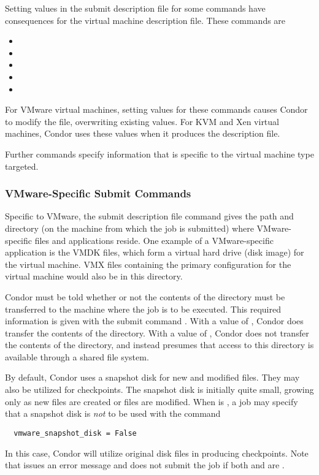 Setting values in the submit description file for some commands
have consequences for the virtual machine description file.
These commands are
\begin{itemize}
  \item {}
  \item {}
  \item {}
  \item {}
  \item {}
\end{itemize}
For VMware virtual machines,
setting values for these commands causes Condor to modify the
 file, overwriting existing values.
For KVM and Xen virtual machines,
Condor uses these values when it produces the description file.

Further commands specify information that is specific to the
virtual machine type targeted.

\subsubsection{\label{sec:vm-VMwaresubmitfile}VMware-Specific Submit Commands}

Specific to VMware, the submit description file command
 gives the path and directory
(on the machine from which the job is submitted)
where VMware-specific files and applications reside.
One example of a VMware-specific application is the VMDK files,
which form a virtual hard drive (disk image) for the virtual machine.
VMX files containing the primary configuration for the virtual
machine would also be in this directory.

Condor must be told whether or not the contents of the 
directory must be transferred to the machine where the job is
to be executed.
This required information is given with the submit command
.
With a value of ,
Condor does transfer the contents of the directory.
With a value of ,
Condor does not transfer the contents of the directory,
and instead presumes that access to this directory is
available through a shared file system.

By default, Condor uses a snapshot disk for new and modified files.
They may also be utilized for checkpoints.
The snapshot disk is initially quite small,
growing only as new files are created or files are modified.
When  is ,
a job may specify that a snapshot disk is \emph{not} to be
used with the command
\begin{verbatim}
  vmware_snapshot_disk = False
\end{verbatim}
In this case, Condor will utilize original disk files in producing
checkpoints. 
Note that  issues an error message and does not
submit the job if both 
and  are .


